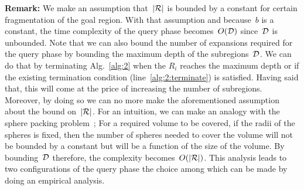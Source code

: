 \documentclass[a4paper,10pt]{article}
\begin{document}
%
\textbf{Remark:}
We make an assumption that~$|\mathcal{R}|$ is bounded by a constant for certain fragmentation of the goal region. With that assumption and because~$b$ is a constant, the time complexity of the query phase becomes~$O(\mathcal{D})$ since~$\mathcal{D}$ is unbounded.
%
Note that we can also bound the number of expansions required for the query phase by bounding the maximum depth of the subregions~$\mathcal{D}$. We can do that by terminating Alg.~\ref{alg:2} when the $R_i$ reaches the maximum depth or if the existing termination condition (line~\ref{alg:2:terminate}) is satisfied. Having said that, this will come at the price of increasing the number of subregions. Moreover, by doing so we can no more make the aforementioned assumption about the bound on~$|\mathcal{R}|$. For an intuition, we can make an analogy with the sphere packing problem~\cite{hales1992sphere}; For a required volume to be covered, if the radii of the spheres is fixed, then the number of spheres needed to cover the volume will not be bounded by a constant but will be a function of the size of the volume. By bounding~$\mathcal{D}$ therefore, the complexity becomes~$O(|\mathcal{R}|)$. This analysis leads to two  configurations of the query phase the choice among which can be made by doing an empirical analysis.



\end{document}
